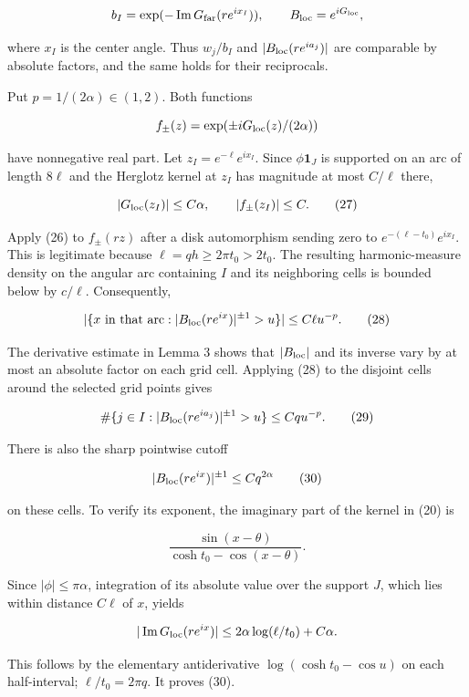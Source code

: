 \documentclass[10pt,a4paper]{article}
\begin{document}
\nopagebreak[4]
\[b_I=\exp(-\operatorname{Im}G_{\rm far}(re^{ix_I})),\qquad
 B_{\rm loc}=e^{iG_{\rm loc}},\]

where \(x_I\) is the center angle. Thus \(w_j/b_I\) and
\(|B_{\rm loc}(re^{ia_j})|\) are comparable by absolute factors, and the
same holds for their reciprocals.

Put \(p=1/(2\alpha)\in(1,2)\). Both functions

\nopagebreak[4]
\[f_\pm(z)=\exp(\pm iG_{\rm loc}(z)/(2\alpha))\]

have nonnegative real part. Let \(z_I=e^{-\ell}e^{ix_I}\). Since
\(\phi\mathbf1_J\) is supported on an arc of length \(8\ell\) and the
Herglotz kernel at \(z_I\) has magnitude at most \(C/\ell\) there,

\nopagebreak[4]
\[|G_{\rm loc}(z_I)|\le C\alpha,\qquad |f_\pm(z_I)|\le C. \tag{27}\]

Apply (26) to \(f_\pm(rz)\) after a disk automorphism sending zero to
\(e^{-(\ell-t_0)}e^{ix_I}\). This is legitimate because
\(\ell=qh\ge2\pi t_0>2t_0\). The resulting harmonic-measure density on
the angular arc containing \(I\) and its neighboring cells is bounded
below by \(c/\ell\). Consequently,

\nopagebreak[4]
\[|\{x\text{ in that arc}:|B_{\rm loc}(re^{ix})|^{\pm1}>u\}|
       \le C\ell u^{-p}. \tag{28}\]

The derivative estimate in Lemma 3 shows that \(|B_{\rm loc}|\) and its
inverse vary by at most an absolute factor on each grid cell. Applying
(28) to the disjoint cells around the selected grid points gives

\nopagebreak[4]
\[\#\{j\in I:|B_{\rm loc}(re^{ia_j})|^{\pm1}>u\}
       \le Cq u^{-p}. \tag{29}\]

There is also the sharp pointwise cutoff

\nopagebreak[4]
\[|B_{\rm loc}(re^{ix})|^{\pm1}\le Cq^{2\alpha} \tag{30}\]

on these cells. To verify its exponent, the imaginary part of the kernel
in (20) is

\nopagebreak[4]
\[\frac{\sin(x-\theta)}{\cosh t_0-\cos(x-\theta)}.\]

Since \(|\phi|\le\pi\alpha\), integration of its absolute value over the
support \(J\), which lies within distance \(C\ell\) of \(x\), yields

\nopagebreak[4]
\[|\operatorname{Im}G_{\rm loc}(re^{ix})|
 \le 2\alpha\log(\ell/t_0)+C\alpha.
\]

This follows by the elementary antiderivative \(\log(\cosh t_0-\cos u)\)
on each half-interval; \(\ell/t_0=2\pi q\). It proves (30).
\end{document}
